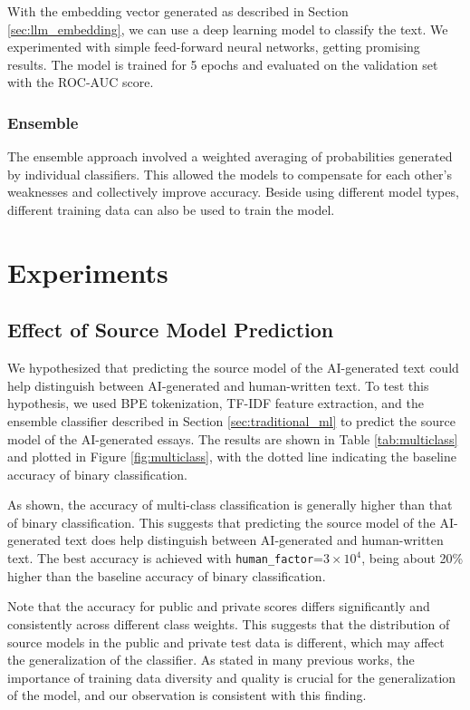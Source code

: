\documentclass[conference]{IEEEtran}
\begin{document}
With the embedding vector generated as described in Section \ref{sec:llm_embedding}, we can use a deep learning model to classify the text. We experimented with simple feed-forward neural networks, getting promising results. The model is trained for 5 epochs and evaluated on the validation set with the ROC-AUC score.

\subsubsection{Ensemble}

The ensemble approach involved a weighted averaging of probabilities generated by individual classifiers. This allowed the models to compensate for each other's weaknesses and collectively improve accuracy. Beside using different model types, different training data can also be used to train the model.

\section{Experiments}

\subsection{Effect of Source Model Prediction}

We hypothesized that predicting the source model of the AI-generated text could help distinguish between AI-generated and human-written text. To test this hypothesis, we used BPE tokenization, TF-IDF feature extraction, and the ensemble classifier described in Section \ref{sec:traditional_ml} to predict the source model of the AI-generated essays. The results are shown in Table \ref{tab:multiclass} and plotted in Figure \ref{fig:multiclass}, with the dotted line indicating the baseline accuracy of binary classification.

As shown, the accuracy of multi-class classification is generally higher than that of binary classification. This suggests that predicting the source model of the AI-generated text does help distinguish between AI-generated and human-written text. The best accuracy is achieved with \texttt{human\_factor}=$3 \times 10^4$, being about 20\% higher than the baseline accuracy of binary classification.

Note that the accuracy for public and private scores differs significantly and consistently across different class weights. This suggests that the distribution of source models in the public and private test data is different, which may affect the generalization of the classifier. As stated in many previous works, the importance of training data diversity and quality is crucial for the generalization of the model, and our observation is consistent with this finding.
\end{document}
